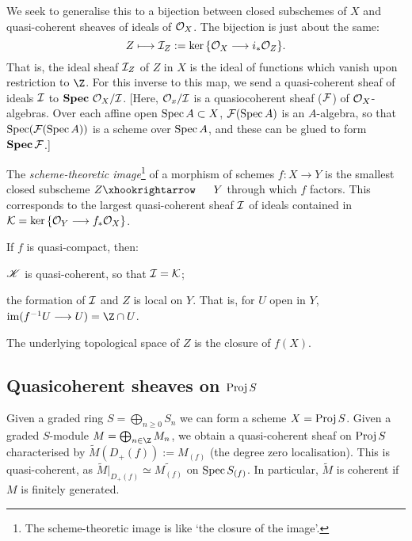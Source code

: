 \documentclass[11pt]{article}
\begin{document}
\begin{Nov1}
We seek to generalise this to a bijection between closed subschemes of $X$ and quasi-coherent sheaves of ideals of $\mathcal{O}_X$. The bijection is just about the same:
\[Z\longmapsto\mathcal{I}_Z:=\textup{ker}\,\{\mathcal{O}_X\longrightarrow i_*\mathcal{O}_Z\}.\]
That is, the ideal sheaf $\mathcal{I}_Z$ of $Z$ in $X$ is the ideal of functions which vanish upon restriction to $\Z$. For this inverse to this map, we send a quasi-coherent sheaf of ideals $\mathcal{I}$ to $\operatorname{\textbf{Spec}}\,\mathcal{O}_X/\mathcal{I}$. [Here, $\mathcal{O}_x/\mathcal{I}$ is a quasiocoherent sheaf ($\mathcal{F}$) of $\mathcal{O}_X$-algebras. Over each affine open $\operatorname{Spec} A\subset X$, $\mathcal{F}(\operatorname{Spec} A)$ is an $A$-algebra, so that $\operatorname{Spec}(\mathcal{F}(\operatorname{Spec} A))$ is a scheme over $\operatorname{Spec} A$, and these can be glued to form $\operatorname{\textbf{Spec}} \mathcal{F}$.]
\begin{defn*}
The \emph{scheme-theoretic image}\footnote{The scheme-theoretic image is like `the closure of the image'.} of a morphism of schemes $f:X\to Y$ is the smallest closed subscheme $Z\cofibration Y$ through which $f$ factors. This corresponds to the largest quasi-coherent sheaf $\mathcal{I}$ of ideals contained in $\mathcal{K}=\textup{ker}\,\{\mathcal{O}_Y\longrightarrow f_*\mathcal{O}_X\}$.
\end{defn*}
\begin{fact*}
If $f$ is quasi-compact, then:
\begin{itemise}
\item $\mathscr{K}$ is quasi-coherent, so that $\mathcal{I}=\mathcal{K}$;
\item the formation of $\mathcal{I}$ and $Z$ is local on $Y$. That is, for $U$ open in $Y$, $\im(f^{-1}U\to U)=\Z\cap U$.
\item The underlying topological space of $Z$ is the closure of $f(X)$.
\end{itemise}
\end{fact*}
\subsection*{Quasicoherent sheaves on $\operatorname{Proj} S$}
Given a graded ring $S=\bigoplus _{n\geq 0}S_n$ we can form a scheme $X=\operatorname{Proj} S$. Given a graded $S$-module $M=\bigoplus _{n\in \Z}M_n$, we obtain a quasi-coherent sheaf  on $\operatorname{Proj} S$ characterised by $\widetilde M(D_+(f)):=M_{(f)}$ (the degree zero localisation). This is quasi-coherent, as $\widetilde M|_{D_+(f)}\simeq \widetilde{M_{(f)}}$ on $\operatorname{Spec} S_{(f)}$. In particular, $\widetilde M$ is coherent if $M$ is finitely generated.


\end{Nov1}
\end{document}
